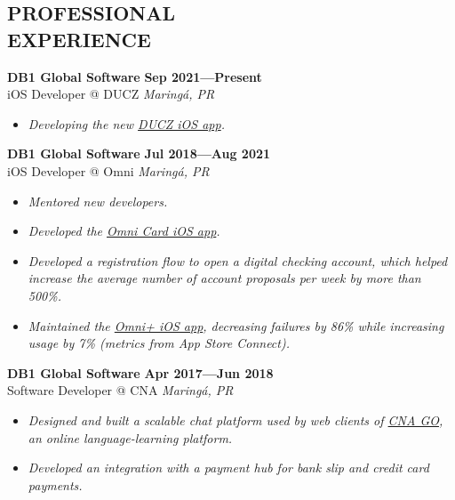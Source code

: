 \documentclass[line,margin]{res}
\begin{document}


\address{\sl \href{https://marcosatanaka.com}{marcosatanaka.com} --- \href{mailto:marcosatanaka@gmail.com}{marcosatanaka@gmail.com}}


\begin{resume}


\section{PROFESSIONAL \\ EXPERIENCE}
  {\bf DB1 Global Software} \hfill {\bf Sep 2021---Present} \\
  iOS Developer @ DUCZ \hfill {\sl Maring\'a, PR}\\[-6pt]
  \begin{itemize}
    \item {\sl Developing the new \href{https://apps.apple.com/br/app/id1592517753}{DUCZ iOS app}.}
  \end{itemize}
  
  {\bf DB1 Global Software} \hfill {\bf Jul 2018---Aug 2021} \\
  iOS Developer @ Omni \hfill {\sl Maring\'a, PR}\\[-6pt]
  \begin{itemize}
    \item {\sl Mentored new developers.}
    \item {\sl Developed the \href{https://apps.apple.com/br/app/id1490242421}{Omni Card iOS app}.}
    \item {\sl Developed a registration flow to open a digital checking account, which helped increase the average number of account proposals per week by more than 500\%.}
    \item {\sl Maintained the \href{https://apps.apple.com/br/app/omni/id1276332750}{Omni+ iOS app}, decreasing failures by 86\% while increasing usage by 7\% (metrics from App Store Connect).}
  \end{itemize}

  {\bf DB1 Global Software} \hfill {\bf Apr 2017---Jun 2018} \\
  Software Developer @ CNA \hfill {\sl Maring\'a, PR}\\[-6pt]
  \begin{itemize}
    \item {\sl Designed and built a scalable chat platform used by web clients of \href{https://www.cnago.com.br}{CNA GO}, an online language-learning platform.}
    \item {\sl Developed an integration with a payment hub for
               bank slip and credit card payments.}
  \end{itemize}


\end{resume}
\end{document}
